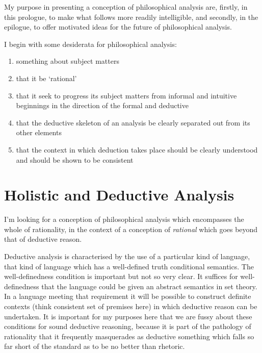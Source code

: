 My purpose in presenting a conception of philosophical analysis are, firstly, in this prologue, to make what follows more readily intelligible, and secondly, in the epilogue, to offer motivated ideas for the future of philosophical analysis.

I begin with some desiderata for philosophical analysis:

\begin{enumerate}
\item something about subject matters
\item that it be `rational'
\item that it seek to progress its subject matters from informal and intuitive beginnings in the direction of the formal and deductive
\item that the deductive skeleton of an analysis be clearly separated out from its other elements
\item that the context in which deduction takes place should be clearly understood and should be shown to be consistent
\end{enumerate}

\section{Holistic and Deductive Analysis}


I'm looking for a conception of philosophical analysis which encompasses the whole of rationality, in the context of a conception of \emph{rational} which goes beyond that of deductive reason.

Deductive analysis is characterised by the use of a particular kind of language, that kind of language which has a well-defined truth conditional semantics.
The well-definedness condition is important but not so very clear.
It suffices for well-definedness that the language could be given an abstract semantics in set theory.
In a language meeting that requirement it will be possible to construct definite contexts (think consistent set of premises here) in which deductive reason can be undertaken.
It is important for my purposes here that we are fussy about these conditions for sound deductive reasoning, because it is part of the pathology of rationality that it frequently masquerades as deductive something which falls so far short of the standard as to be no better than rhetoric.

 
